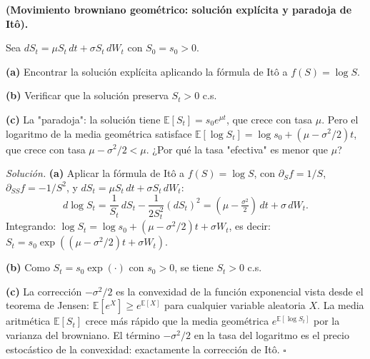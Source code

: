 \begin{ejercicio}
\label{ej:browniano_geometrico}
\textbf{(Movimiento browniano geométrico: solución explícita y paradoja de Itô).}

Sea $dS_t = \mu S_t\,dt + \sigma S_t\,dW_t$ con $S_0 = s_0 > 0$.

\textbf{(a)} Encontrar la solución explícita aplicando la fórmula de Itô a
$f(S) = \log S$.

\textbf{(b)} Verificar que la solución preserva $S_t > 0$ c.s.

\textbf{(c)} La "paradoja": la solución tiene $\mathbb{E}[S_t] = s_0 e^{\mu t}$,
que crece con tasa $\mu$. Pero el logaritmo de la media geométrica satisface
$\mathbb{E}[\log S_t] = \log s_0 + (\mu - \sigma^2/2)t$, que crece con tasa
$\mu - \sigma^2/2 < \mu$. ¿Por qué la tasa "efectiva" es menor que $\mu$?

\medskip\noindent\textit{Solución.}
\textbf{(a)} Aplicar la fórmula de Itô a $f(S) = \log S$, con $\partial_S f = 1/S$,
$\partial_{SS}f = -1/S^2$, y $dS_t = \mu S_t\,dt + \sigma S_t\,dW_t$:
\[
  d\log S_t
  = \frac{1}{S_t}\,dS_t - \frac{1}{2S_t^2}(dS_t)^2
  = (\mu - \tfrac{\sigma^2}{2})\,dt + \sigma\,dW_t.
\]
Integrando: $\log S_t = \log s_0 + (\mu-\sigma^2/2)t + \sigma W_t$, es decir:
$S_t = s_0\exp((\mu-\sigma^2/2)t + \sigma W_t)$.

\textbf{(b)} Como $S_t = s_0\exp(\cdot)$ con $s_0 > 0$, se tiene $S_t > 0$ c.s.

\textbf{(c)} La corrección $-\sigma^2/2$ es la convexidad de la función exponencial
vista desde el teorema de Jensen: $\mathbb{E}[e^X] \geq e^{\mathbb{E}[X]}$ para
cualquier variable aleatoria $X$. La media aritmética $\mathbb{E}[S_t]$ crece
más rápido que la media geométrica $e^{\mathbb{E}[\log S_t]}$ por la varianza
del browniano. El término $-\sigma^2/2$ en la tasa del logaritmo es el precio
estocástico de la convexidad: exactamente la corrección de Itô. $\square$
\end{ejercicio}

